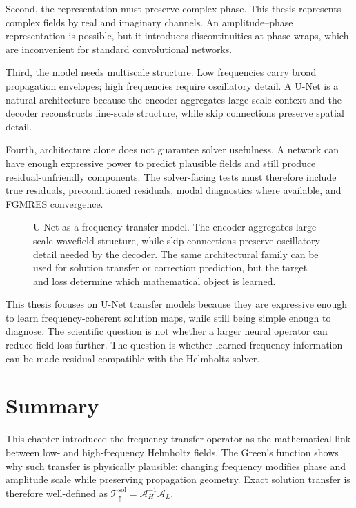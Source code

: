 Second, the representation must preserve complex phase. This thesis represents
complex fields by real and imaginary channels. An amplitude--phase
representation is possible, but it introduces discontinuities at phase wraps,
which are inconvenient for standard convolutional networks.

Third, the model needs multiscale structure. Low frequencies carry broad
propagation envelopes; high frequencies require oscillatory detail. A U-Net is
a natural architecture because the encoder aggregates large-scale context and
the decoder reconstructs fine-scale structure, while skip connections preserve
spatial detail.

Fourth, architecture alone does not guarantee solver usefulness. A network can
have enough expressive power to predict plausible fields and still produce
residual-unfriendly components. The solver-facing tests must therefore include
true residuals, preconditioned residuals, modal diagnostics where available,
and FGMRES convergence.

\begin{figure}[htbp]
    \centering
    \caption{U-Net as a frequency-transfer model. The encoder aggregates
    large-scale wavefield structure, while skip connections preserve
    oscillatory detail needed by the decoder. The same architectural family
    can be used for solution transfer or correction prediction, but the target
    and loss determine which mathematical object is learned.}
    \label{fig:ch5-unet-frequency-transfer-schematic}
\end{figure}

This thesis focuses on U-Net transfer models because they are expressive
enough to learn frequency-coherent solution maps, while still being simple
enough to diagnose. The scientific question is not whether a larger neural
operator can reduce field loss further. The question is whether learned
frequency information can be made residual-compatible with the Helmholtz
solver.

\section{Summary}
\label{sec:ch5-summary}

This chapter introduced the frequency transfer operator as the mathematical
link between low- and high-frequency Helmholtz fields. The Green's function
shows why such transfer is physically plausible: changing frequency modifies
phase and amplitude scale while preserving propagation geometry. Exact
solution transfer is therefore well-defined as
$\mathcal{T}_{\uparrow}^{\mathrm{sol}}=\mathcal{A}_H^{-1}\mathcal{A}_L$.

